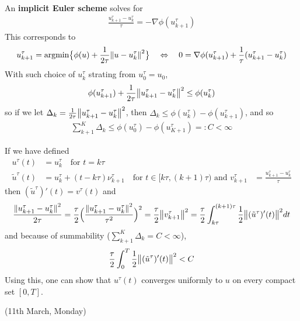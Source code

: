 \documentclass[12pt,a4paper]{article}
\begin{document}
\quad An \textbf{implicit Euler scheme} solves for
\begin{align*}
\frac{u_{k+1}^{\tau} - u_k^{\tau}}{\tau} = -\nabla \phi (u_{k+1}^{\tau})
\end{align*}
This corresponds to
\begin{align*}
u_{k+1}^{\tau} = \text{argmin} \big\{ \phi(u) + \frac{1}{2\tau} \snorms{u- u_k^{\tau}}{}^2 \big\} \quad \Leftrightarrow \quad 0 =\nabla \phi(u^{\tau}_{k+1}) + \frac{1}{\tau}(u^{\tau}_{k+1} - u^{\tau}_k)
\end{align*}
With such choice of $u^{\tau}_{k}$ strating from $u^{\tau}_0 =u_0$,
\begin{align*}
\phi(u_{k+1}^{\tau}) + \frac{1}{2\tau} \bigl\lVert u^{\tau}_{k+1} - u^{\tau}_{k}\bigr\rVert_{}^2 \leq \phi(u_k^{\tau})
\end{align*}
so if we let $\Delta_k = \frac{1}{2\tau} \bigl\lVert u^{\tau}_{k+1}- u_k^{\tau}\bigr\rVert_{}^2$, then $\Delta_k \leq \phi(u_k^{\tau}) - \phi(u^{\tau}_{k+1})$, and so
\begin{align*}
\sum_{k+1}^K \Delta_k \leq \phi(u_0^{\tau}) - \phi(u^{\tau}_{K+1}) =: C < \infty
\end{align*}
\s

If we have defined
\begin{align*}
u^{\tau}(t) &= u^{\tau}_k \quad \text{for } t= k\tau \\
\tilde{u}^{\tau}(t) &= u_k^{\tau} + (t- k \tau) \nu^{\tau}_{k+1} \quad \text{for } t \in [ k\tau, (k+1) \tau ) \text{ and } v_{k+1}^{\tau} &= \frac{u_{k+1}^{\tau}- u_k^{\tau}}{\tau}
\end{align*}
then $(\tilde{u}^{\tau})'(t) =v^{\tau}(t)$ and
\begin{align*}
\frac{ \snorms{ u^{\tau}_{k+1} - u^{\tau}_k }{}^2 }{2\tau} = \frac{\tau}{2} \Big( \frac{ \snorms{u^{\tau}_{k+1} - u^{\tau}_k}{}^2}{\tau^2} \Big)^2 = \frac{\tau}{2} \norms{v^{\tau}_{k+1}}{}^2 = \frac{\tau}{2} \int_{k\tau}^{(k+1)\tau} \frac{1}{2} \norms{ (\tilde{u}^{\tau})'(t) }{}^2 dt
\end{align*}
and because of summability ($\sum_{k+1}^K \Delta_k = C < \infty$), 
\begin{align*}
\frac{\tau}{2} \int_0^T \frac{1}{2}\bigl\lVert(\tilde{u}^{\tau})'(t)\bigr\rVert_{}^2 <C
\end{align*}
Using this, one can show that $u^{\tau}(t)$ converges uniformly to $u$ on every compact set $[0,T]$.
\s

\newday

(11th March, Monday)
\s
\end{document}
